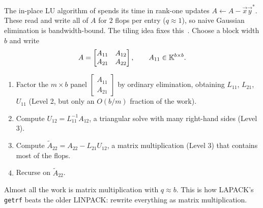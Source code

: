 The in-place LU algorithm of  spends its time in rank-one updates $A \gets A - \vec{x}\vec{y}^\ast$. These read and write all of $A$ for $2$ flops per entry ($q \approx 1$), so naive Gaussian elimination is bandwidth-bound. The tiling idea fixes this~\cite[\S2.6.3]{Demmel}. Choose a block width $b$ and write
\begin{equation}
  A = \begin{bmatrix} A_{11} & A_{12} \\ A_{21} & A_{22} \end{bmatrix}, \qquad A_{11} \in \mathbb{K}^{b \times b}.
\end{equation}
\begin{enumerate}
  \item Factor the $m \times b$ panel $\begin{bmatrix} A_{11} \\ A_{21} \end{bmatrix}$ by ordinary elimination, obtaining $L_{11}$, $L_{21}$, $U_{11}$ (Level 2, but only an $O(b/m)$ fraction of the work).
  \item Compute $U_{12} = L_{11}^{-1}A_{12}$, a triangular solve with many right-hand sides (Level 3).
  \item Compute $\tilde{A}_{22} = A_{22} - L_{21}U_{12}$, a matrix multiplication (Level 3) that contains most of the flops.
  \item Recurse on $\tilde{A}_{22}$.
\end{enumerate}
Almost all the work is matrix multiplication with $q \approx b$. This is how LAPACK's \texttt{getrf} beats the older LINPACK: rewrite everything as matrix multiplication.
